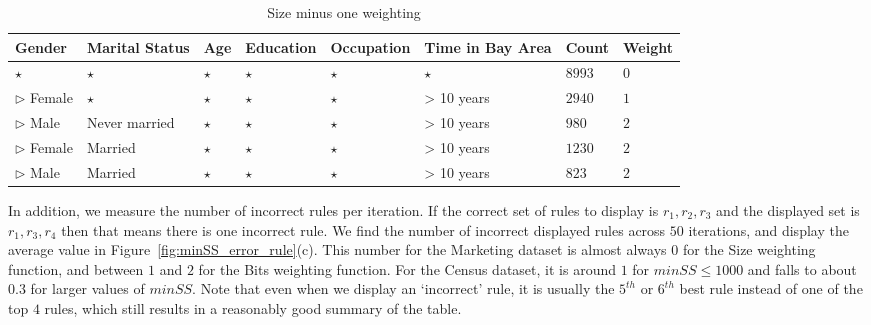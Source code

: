 \begin{table} 
\scriptsize
\centering 
\begin{tabular}{| p{1.5cm} | p{1.5cm} | p{1.5cm} | p{1.5cm} | p{1.5cm} | p{1.5cm} | l | l |} 
\hline Gender & Marital Status & Age & Education & Occupation & Time in Bay Area & Count & Weight \\ \hline 
\cline{1-8} $\star$ & $\star$ & $\star$ & $\star$ & $\star$ & $\star$ & $8993$ & $0$ \\
\cline{1-1} \cline{2-2} \cline{3-3} \cline{4-4} \cline{5-5} \cline{6-6} \cline{7-8} $\triangleright$ Female & $\star$ & $\star$ & $\star$ & $\star$ & > 10 years & $2940$ & $1$ \\
\cline{1-1} \cline{2-2} \cline{3-3} \cline{4-4} \cline{5-5} \cline{6-6} \cline{7-8} $\triangleright$ Male & Never married & $\star$ & $\star$ & $\star$ & > 10 years & $980$ & $2$ \\
\cline{1-1} \cline{2-2} \cline{3-3} \cline{4-4} \cline{5-5} \cline{6-6} \cline{7-8} $\triangleright$ Female & Married & $\star$ & $\star$ & $\star$ & > 10 years & $1230$ & $2$ \\
\cline{1-1} \cline{2-2} \cline{3-3} \cline{4-4} \cline{5-5} \cline{6-6} \cline{7-8} $\triangleright$ Male & Married & $\star$ & $\star$ & $\star$ & > 10 years & $823$ & $2$ \\
\hline 
\end{tabular}
\vspace{-10pt}
\caption{Size minus one weighting \label{table:weightingsizeminusone}} 
\vspace{-10pt}
\end{table}  



In addition, we measure the number of incorrect rules per iteration. If the correct set of rules to display is $r_1, r_2, r_3$ and the displayed set is $r_1, r_3, r_4$ then that means there is one incorrect rule. We find the number of incorrect displayed rules across $50$ iterations, and display the average value in Figure~\ref{fig:minSS_error_rule}(c). This number for the Marketing dataset is almost always $0$ for the Size weighting function, and between $1$ and $2$ for the Bits weighting function. For the Census dataset, it is around $1$ for $minSS \leq 1000$ and falls to about $0.3$ for larger values of $minSS$. Note that even when we display an `incorrect' rule, it is usually the $5^{th}$ or $6^{th}$ best rule instead of one of the top $4$ rules, which still results in a reasonably good summary of the table.

